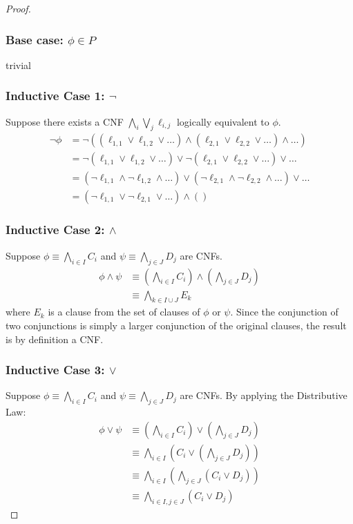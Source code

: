 \documentclass{article}
\begin{document}
\begin{proof}
\subsubsection*{Base case: $\phi \in P$}
trivial
\subsubsection*{Inductive Case 1: $\neg$ }
Suppose there exists a CNF $\bigwedge_i \bigvee_j \ell_{i, j}$ logically equivalent to $\phi$. 
\begin{align*}
    \neg \phi &= \neg ((\ell_{1,1}\lor \ell_{1, 2}\lor \dots) \land (\ell_{2, 1}\lor \ell_{2, 2} \lor \dots ) \land \dots)\\
    &=\neg(\ell_{1,1}\lor \ell_{1, 2}\lor \dots) \lor \neg(\ell_{2, 1}\lor \ell_{2, 2} \lor \dots ) \lor \dots\\
    &=(\neg \ell_{1,1}\land \neg\ell_{1, 2}\land \dots) \lor (\neg\ell_{2, 1}\land \neg\ell_{2, 2} \land \dots ) \lor \dots\\
    &= (\neg \ell_{1,1} \lor \neg \ell_{2, 1} \lor \dots) \land ()
\end{align*}
\subsubsection*{Inductive Case 2: $\land$}
Suppose $\phi \equiv \bigwedge_{i \in I} C_i$ and $\psi \equiv \bigwedge_{j \in J} D_j$ are CNFs.
\begin{align*}
    \phi \land \psi &\equiv \left( \bigwedge_{i \in I} C_i \right) \land \left( \bigwedge_{j \in J} D_j \right) \\
    &\equiv \bigwedge_{k \in I \cup J} E_k
\end{align*}
where $E_k$ is a clause from the set of clauses of $\phi$ or $\psi$. Since the conjunction of two conjunctions is simply a larger conjunction of the original clauses, the result is by definition a CNF.

\subsubsection*{Inductive Case 3: $\lor$}
Suppose $\phi \equiv \bigwedge_{i \in I} C_i$ and $\psi \equiv \bigwedge_{j \in J} D_j$ are CNFs. By applying the Distributive Law:
\begin{align*}
    \phi \lor \psi &\equiv \left( \bigwedge_{i \in I} C_i \right) \lor \left( \bigwedge_{j \in J} D_j \right) \\
    &\equiv \bigwedge_{i \in I} \left( C_i \lor \left( \bigwedge_{j \in J} D_j \right) \right) \\
    &\equiv \bigwedge_{i \in I} \left( \bigwedge_{j \in J} (C_i \lor D_j) \right) \\
    &\equiv \bigwedge_{i \in I, j \in J} (C_i \lor D_j)
\end{align*}


\end{proof}
\end{document}
